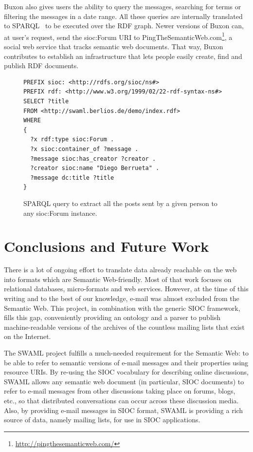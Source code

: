 \documentclass{llncs}
\begin{document}
Buxon also gives users the ability to query the messages, searching
for terms or filtering the messages in a date range. All these queries
are internally translated to SPARQL~\cite{SPARQLProtocol} to be executed
over the RDF graph. Newer versions of Buxon can, at user's request, send 
the \textsf{sioc:Forum} URI to PingTheSemanticWeb.com\footnote{\url{http://pingthesemanticweb.com/}}, 
a social web service that tracks semantic web documents. That way, Buxon
contributes to establish an infrastructure that lets people easily create, 
find and publish RDF documents.

\begin{figure}[ht]
\lstset{language=SPARQL}
\begin{lstlisting}
PREFIX sioc: <http://rdfs.org/sioc/ns#>
PREFIX rdf: <http://www.w3.org/1999/02/22-rdf-syntax-ns#>
SELECT ?title
FROM <http://swaml.berlios.de/demo/index.rdf>
WHERE
{
  ?x rdf:type sioc:Forum .
  ?x sioc:container_of ?message .
  ?message sioc:has_creator ?creator .
  ?creator sioc:name "Diego Berrueta" .
  ?message dc:title ?title
}
\end{lstlisting}
\caption{SPARQL query to extract all the posts sent by a given person to any \textsf{sioc:Forum} instance.}
\label{fig:sparqlquery}
\end{figure}

\section{\label{sec:conclusions}Conclusions and Future Work}

There is a lot of ongoing effort to translate data already reachable
on the web into formats which are Semantic Web-friendly. Most of that 
work focuses on relational databases, micro-formats and web services. 
However, at the time of this writing and to the best of our knowledge, 
e-mail was almost excluded from the Semantic Web. This project, in 
combination with the generic SIOC framework, fills this gap, conveniently 
providing an ontology and a parser to publish machine-readable versions 
of the archives of the countless mailing lists that exist on the Internet.

The SWAML project fulfills a much-needed requirement for the Semantic Web: 
to be able to refer to semantic versions of e-mail messages and their 
properties using resource URIs. By re-using the SIOC vocabulary for describing
online discussions, SWAML allows any semantic web document (in particular,
SIOC documents) to refer to
e-mail messages 
from other discussions taking place on forums, blogs, etc., so that distributed 
conversations can occur across these discussion media. Also, by providing e-mail 
messages in SIOC format, SWAML is providing a rich source of data, namely 
mailing lists, for use in SIOC applications.
\end{document}
